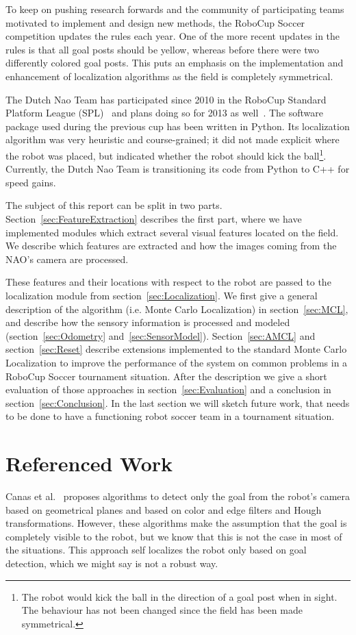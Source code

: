 \documentclass[	DIV=calc,%
							paper=a4,%
							fontsize=9pt,%
							twocolumn]{scrartcl}	 					%
\begin{document}
To keep on pushing research forwards and the community of participating teams motivated to implement and design new methods, the RoboCup Soccer competition updates the rules each year.  One of the more recent updates in the rules is that all goal posts should be yellow, whereas before there were two differently colored goal posts.  This puts an emphasis on the implementation and enhancement of localization algorithms as the field is completely symmetrical.

The Dutch Nao Team has participated since 2010 in the RoboCup Standard Platform League (SPL)~\cite{DNT-TD10, DNT-TD11, DNT-TD12} and plans doing so for 2013 as well~\cite{DNT-TD13}.  The software package used during the previous cup has been written in Python.  Its localization algorithm was very heuristic and course-grained; it did not made explicit where the robot was placed, but indicated whether the robot should kick the ball\footnote{The robot would kick the ball in the direction of a goal post when in sight. The behaviour has not been changed since the field has been made symmetrical.}.  Currently, the Dutch Nao Team is transitioning its code from Python to C++ for speed gains. 

The subject of this report can be split in two parts. Section~\ref{sec:FeatureExtraction} describes the first part, where we have implemented modules which extract several visual features located on the field.  We describe which features are extracted and how the images coming from the NAO's camera are processed. 

These features and their locations with respect to the robot are passed to the localization module from section~\ref{sec:Localization}.  We first give a general description of the algorithm (i.e. Monte Carlo Localization) in section~\ref{sec:MCL}, and describe how the sensory information is processed and modeled (section~\ref{sec:Odometry} and~\ref{sec:SensorModel}). Section~\ref{sec:AMCL} and section~\ref{sec:Reset} describe extensions implemented to the standard Monte Carlo Localization to improve the performance of the system on common problems in a RoboCup Soccer tournament situation. 
After the description we give a short evaluation of those approaches in section~\ref{sec:Evaluation} and a conclusion in section~\ref{sec:Conclusion}. In the last section we will sketch future work, that needs to be done to have a functioning robot soccer team in a tournament situation.

\section{Referenced Work}
\label{sec:ReferencedWork}
Canas et al.~\cite{canas2009visual} proposes algorithms to detect only the goal from the robot's camera based on geometrical planes and based on color and edge filters and Hough transformations. However, these algorithms make the assumption that the goal is completely visible to the robot, but we know that this is not the case in most of the situations. This approach self localizes the robot only based on goal detection, which we might say is not a robust way.
\end{document}
